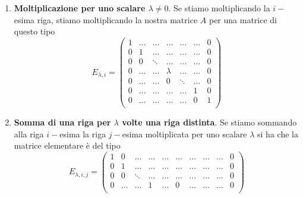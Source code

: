 \begin{enumerate}
$$  $$
  scambia la prima riga con la terza, siccome
  $$
    \begin{pmatrix}
      0 & 0 & 1 \\
      0 & 1 & 0 \\
      1 & 0 & 0
    \end{pmatrix} \begin{pmatrix}
      1 & 2 & -1 \\
      0 & 1 & -3 \\
      -1 & 4 & 5 
    \end{pmatrix} = \begin{pmatrix}
      -1 & 4 & 5 \\
      0 & 1 & -3 \\
      1 & 2 & -1
    \end{pmatrix}
  $$
  \item \textbf{Moltiplicazione per uno scalare $\lambda \neq 0$}. Se stiamo moltiplicando la $i-$esima riga, stiamo moltiplicando la nostra matrice $A$ per una matrice di questo tipo
  $$
      E_{\lambda, i} = \begin{pmatrix}
        1 & \ldots & \ldots & \ldots & \ldots & \ldots & 0\\
        0 & 1 & \ldots & \ldots & \ldots & \ldots & 0\\
        0 & 0 & \ddots & \ldots & \ldots & \ldots & 0\\
        0 & \ldots & \ldots & \lambda & \ldots & \ldots & 0 \\
        0 & \ldots & \ldots & 0 & \ddots & \ldots  & 0 \\
        0 & \ldots & \ldots & \ldots & \ldots & 1 & 0 \\
        0 & \ldots & \ldots & \ldots & \ldots & 0 & 1 \\
      \end{pmatrix}
  $$
  \item \textbf{Somma di una riga per $\lambda$ volte una riga distinta}. Se stiamo sommando alla riga $i-$esima la riga $j-$esima moltiplicata per uno scalare $\lambda$ si ha che la matrice elementare è del tipo
  $$
      E_{\lambda, i, j} = \begin{pmatrix}
      1 & 0 & \ldots & \ldots & \ldots & \ldots & \ldots & \ldots & \ldots & 0 \\
      0 & 1 & \ldots & \ldots & \ldots & \ldots & \ldots & \ldots & \ldots & 0 \\
      0 & 0 & \ddots & \ldots & \ldots & \ldots & \ldots & \ldots & \ldots & 0 \\
      0 & \ldots & \ldots & 1 & \ldots & 0 & \ldots & \ldots & \ldots & 0 \\

\end{pmatrix}$$
\end{enumerate}
